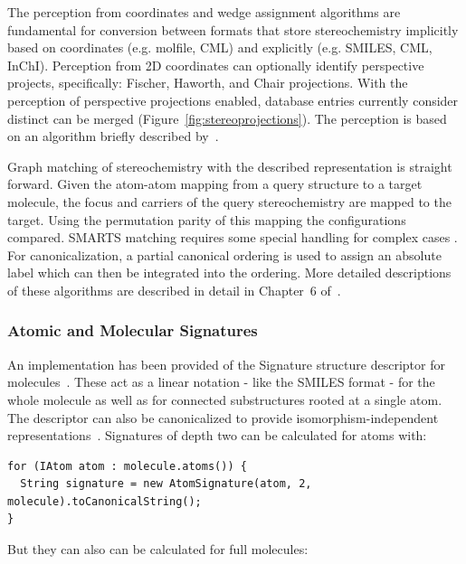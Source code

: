 \documentclass[10pt]{bmcart}
\begin{document}
  The perception from coordinates and wedge assignment algorithms are fundamental for conversion
  between formats that store stereochemistry implicitly based on coordinates (e.g. molfile, CML) and 
  explicitly (e.g. SMILES, CML, InChI). Perception from 2D coordinates can optionally identify
  perspective projects, specifically: Fischer, Haworth, and Chair projections. With the perception of 
  perspective projections enabled, database entries currently consider distinct can be merged
  (Figure~\ref{fig:stereoprojections}).  The perception is based on an  algorithm briefly  
  described by~\cite{Karapetyan2015}.


  Graph matching of stereochemistry with the described representation is straight forward. Given
  the atom-atom mapping from a query structure to a target molecule, the focus and carriers of 
  the query stereochemistry are mapped to the target. Using the permutation parity of this mapping
  the configurations compared. SMARTS matching requires some special handling for complex cases 
  \cite{May2014_SMARTS}. For canonicalization, a partial canonical ordering is used to assign an 
  absolute label which can then be integrated into the ordering. More detailed descriptions of 
  these algorithms are described in detail in Chapter~6 of~\cite{May2015}.

  \subsubsection*{Atomic and Molecular Signatures}

  An implementation has been provided of the Signature structure descriptor for
  molecules~\cite{Faulon2003}. These act as a linear notation - like the SMILES format - 
  for the whole molecule as well as for connected substructures rooted at a single atom. The 
  descriptor can also be canonicalized to provide isomorphism-independent
  representations~\cite{Faulon2004}. Signatures of depth two can be calculated
  for atoms with:

\vspace{0.2cm}
\begin{verbatim}
for (IAtom atom : molecule.atoms()) {
  String signature = new AtomSignature(atom, 2, molecule).toCanonicalString();
}
\end{verbatim}
\vspace{0.2cm}

  But they can also can be calculated for full molecules:
\end{document}
